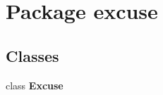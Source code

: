 \section{Package excuse}
\label{namespaceexcuse}


\subsection*{Classes}
\begin{CompactItemize}
\item 
class \bf{Excuse}
\end{CompactItemize}
